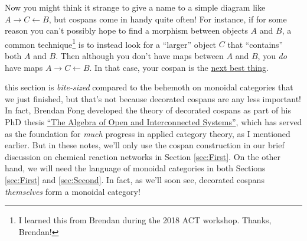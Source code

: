 \documentclass{tufte-handout-tai}
\theoremstyle{plain}
\theoremstyle{definition}
\theoremstyle{remark}
\begin{document}
Now you might think it strange to give a name to a simple diagram like $A\to C\leftarrow B$, but cospans come in handy quite often! For instance, if for some reason you can't possibly hope to find a morphism between objects $A$ and $B$, a common technique\footnote{I learned this from Brendan during the 2018 ACT workshop. Thanks, Brendan!} is to instead look for a ``larger'' object $C$ that ``contains'' both $A$ and $B$. Then although you don't have maps between $A$ and $B$, you \textit{do} have maps $A\to C\leftarrow B$. In that case, your cospan is the \href{https://twitter.com/math3ma/status/989233108137533442}{next best thing}.

 this section is \textit{bite-sized} compared to the behemoth on monoidal categories that we just finished, but that's not because decorated cospans are any less important! In fact, Brendan Fong developed the theory of decorated cospans as part of his PhD thesis \href{https://arxiv.org/pdf/1609.05382.pdf}{``The Algebra of Open and Interconnected Systems''}, which has served as the foundation for \textit{much} progress in applied category theory, as I mentioned earlier. But in these notes, we'll only use the cospan construction in our brief discussion on chemical reaction networks in Section \ref{sec:First}. On the other hand, we will need the language of monoidal categories in both Sections \ref{sec:First} and \ref{sec:Second}. In fact, as we'll soon see, decorated cospans \textit{themselves} form a monoidal category!


\newpage
\end{document}
